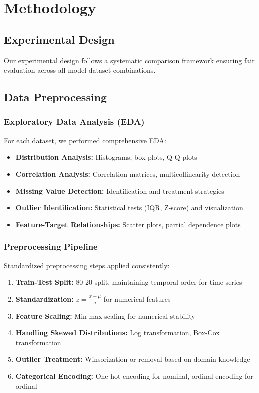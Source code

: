 \documentclass[11pt,a4paper]{article}
\begin{document}
\section{Methodology}

\subsection{Experimental Design}

Our experimental design follows a systematic comparison framework ensuring fair evaluation across all model-dataset combinations.

\subsection{Data Preprocessing}

\subsubsection{Exploratory Data Analysis (EDA)}

For each dataset, we performed comprehensive EDA:

\begin{itemize}
    \item \textbf{Distribution Analysis:} Histograms, box plots, Q-Q plots
    \item \textbf{Correlation Analysis:} Correlation matrices, multicollinearity detection
    \item \textbf{Missing Value Detection:} Identification and treatment strategies
    \item \textbf{Outlier Identification:} Statistical tests (IQR, Z-score) and visualization
    \item \textbf{Feature-Target Relationships:} Scatter plots, partial dependence plots
\end{itemize}

\subsubsection{Preprocessing Pipeline}

Standardized preprocessing steps applied consistently:

\begin{enumerate}
    \item \textbf{Train-Test Split:} 80-20 split, maintaining temporal order for time series
    \item \textbf{Standardization:} $z = \frac{x - \mu}{\sigma}$ for numerical features
    \item \textbf{Feature Scaling:} Min-max scaling for numerical stability
    \item \textbf{Handling Skewed Distributions:} Log transformation, Box-Cox transformation
    \item \textbf{Outlier Treatment:} Winsorization or removal based on domain knowledge
    \item \textbf{Categorical Encoding:} One-hot encoding for nominal, ordinal encoding for ordinal
\end{enumerate}
\end{document}
